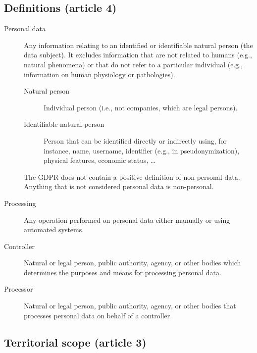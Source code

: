 \subsection{Definitions (article 4)}

\begin{description}
    \item[Personal data] 
        Any information relating to an identified or identifiable natural person (the data subject). It excludes information that are not related to humans (e.g., natural phenomena) or that do not refer to a particular individual (e.g., information on human physiology or pathologies).

        \begin{description}
            \item[Natural person]
                Individual person (i.e., not companies, which are legal persons).

            \item[Identifiable natural person]
                Person that can be identified directly or indirectly using, for instance, name, username, identifier (e.g., in pseudonymization), physical features, economic status, \dots
        \end{description}

        \begin{remark}
            The GDPR does not contain a positive definition of non-personal data. Anything that is not considered personal data is non-personal.
        \end{remark}

    \item[Processing] 
        Any operation performed on personal data either manually or using automated systems.

    \item[Controller] 
        Natural or legal person, public authority, agency, or other bodies which determines the purposes and means for processing personal data.

    \item[Processor] 
        Natural or legal person, public authority, agency, or other bodies that processes personal data on behalf of a controller.
\end{description}


\subsection{Territorial scope (article 3)}

